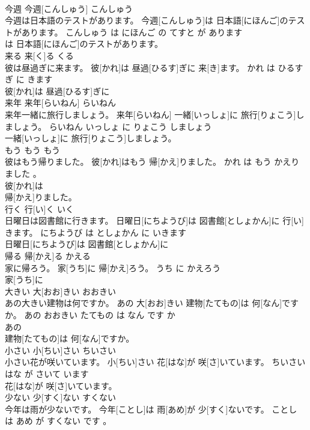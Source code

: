 \documentclass[8pt]{extreport}
\begin{document}
\begin{CJK}{UTF8}{min}
\\	今週	今週[こんしゅう]	こんしゅう	
\\	今週は日本語のテストがあります。	今週[こんしゅう]は 日本語[にほんご]のテストがあります。	こんしゅう は にほんご の てすと が あります	
\\	は 日本語[にほんご]のテストがあります。		
\\	来る	来[く]る	くる	
\\	彼は昼過ぎに来ます。	彼[かれ]は 昼過[ひるす]ぎに 来[き]ます。	かれ は ひるすぎ に きます	
\\	彼[かれ]は 昼過[ひるす]ぎに
\\	来年	来年[らいねん]	らいねん	
\\	来年一緒に旅行しましょう。	来年[らいねん] 一緒[いっしょ]に 旅行[りょこう]しましょう。	らいねん いっしょ に りょこう しましょう	
\\	一緒[いっしょ]に 旅行[りょこう]しましょう。		
\\	もう	もう	もう	
\\	彼はもう帰りました。	彼[かれ]はもう 帰[かえ]りました。	かれ は もう かえりました 。	
\\	彼[かれ]は
\\	帰[かえ]りました。		
\\	行く	行[い]く	いく	
\\	日曜日は図書館に行きます。	日曜日[にちようび]は 図書館[としょかん]に 行[い]きます。	にちようび は としょかん に いきます	
\\	日曜日[にちようび]は 図書館[としょかん]に
\\	帰る	帰[かえ]る	かえる	
\\	家に帰ろう。	家[うち]に 帰[かえ]ろう。	うち に かえろう	
\\	家[うち]に
\\	大きい	大[おお]きい	おおきい	
\\	あの大きい建物は何ですか。	あの 大[おお]きい 建物[たてもの]は 何[なん]ですか。	あの おおきい たてもの は なん です か	
\\	あの
\\	建物[たてもの]は 何[なん]ですか。		
\\	小さい	小[ちい]さい	ちいさい	
\\	小さい花が咲いています。	小[ちい]さい 花[はな]が 咲[さ]いています。	ちいさい はな が さいて います	
\\	花[はな]が 咲[さ]いています。		
\\	少ない	少[すく]ない	すくない	
\\	今年は雨が少ないです。	今年[ことし]は 雨[あめ]が 少[すく]ないです。	ことし は あめ が すくない です 。	

\end{CJK}
\end{document}
